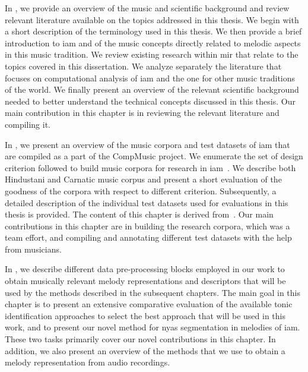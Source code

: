 In , we provide an overview of the music and scientific background and review relevant literature available on the topics addressed in this thesis. We begin with a short description of the terminology used in this thesis. We then provide a brief introduction to \gls{iam} and of the music concepts directly related to melodic aspects in this music tradition. We review existing research within \gls{mir} that relate to the topics covered in this dissertation. We analyze separately the literature that focuses on computational analysis of \gls{iam} and the one for other music traditions of the world. We finally present an overview of the relevant scientific background needed to better understand the technical concepts discussed in this thesis. Our main contribution in this chapter is in reviewing the relevant literature and compiling it.

In , we present an overview of the music corpora and test datasets of \gls{iam} that are compiled as a part of the CompMusic project. We enumerate the set of design criterion followed to build music corpora for research in \gls{iam}~\citep{serra:14:corpus}. We describe both Hindustani and Carnatic music corpus and present a short evaluation of the goodness of the corpora with respect to different criterion. Subsequently, a detailed description of the individual test datasets used for evaluations in this thesis is provided. The content of this chapter is derived from~\citep{serra:14:corpus,CM_Corpora_Ajay14}. Our main contributions in this chapter are in building the research corpora, which was a team effort, and compiling and annotating different test datasets with the help from musicians.

In , we describe different data pre-processing blocks employed in our work to obtain musically relevant melody representations and descriptors that will be used by the methods described in the subsequent chapters. The main goal in this chapter is to present an extensive comparative evaluation of the available tonic identification approaches to select the best approach that will be used in this work, and to present our novel method for \gls{nyas} segmentation in melodies of \gls{iam}. These two tasks primarily cover our novel contributions in this chapter. In addition, we also present an overview of the methods that we use to obtain a melody representation from audio recordings.


